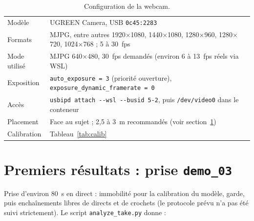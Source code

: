 \documentclass[11pt,a4paper]{article}
\newcommand{\code}[1]{\texttt{\small #1}}
\begin{document}
\begin{table}[H]
\centering
\begin{tabularx}{\textwidth}{@{}lX@{}}
\toprule
Modèle & UGREEN Camera, USB \code{0c45:2283} \\
Formats & MJPG, entre autres 1920$\times$1080, 1440$\times$1080, 1280$\times$960, 1280$\times$720, 1024$\times$768 ; 5 à 30~fps \\
Mode utilisé & MJPG 640$\times$480, 30~fps demandés (environ 6 à 13~fps réels via WSL) \\
Exposition & \code{auto\_exposure = 3} (priorité ouverture), \code{exposure\_dynamic\_framerate = 0} \\
Accès & \code{usbipd attach -{}-wsl -{}-busid 5-2}, puis \code{/dev/video0} dans le conteneur \\
Placement & Face au sujet ; 2,5 à 3~m recommandés (voir section~\ref{sec:resultats}) \\
Calibration & Tableau~\ref{tab:calib} \\
\bottomrule
\end{tabularx}
\caption{Configuration de la webcam.}
\end{table}

\section{Premiers résultats : prise \code{demo\_03}}
\label{sec:resultats}

Prise d'environ 80~s en direct : immobilité pour la calibration du modèle, garde, puis enchaînements libres de directs et de crochets (le protocole prévu n'a pas été suivi strictement). Le script \code{analyze\_take.py} donne :
\end{document}
